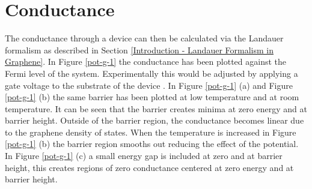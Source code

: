 		\section{Conductance}
		\label{Rectangular Barrier - Conductance}
	The conductance through a device can then be calculated via the Landauer formalism as described in Section \ref{Introduction - Landauer Formalism in Graphene}. In Figure \ref{pot-g-1} the conductance has been plotted against the Fermi level of the system. Experimentally this would be adjusted by applying a gate voltage to the substrate of the device \cite{b46}. In Figure \ref{pot-g-1} (a) and Figure \ref{pot-g-1} (b) the same barrier has been plotted at low temperature and at room temperature. It can be seen that the barrier creates minima at zero energy and at barrier height. Outside of the barrier region, the conductance becomes linear due to the graphene density of states. When the temperature is increased in Figure \ref{pot-g-1} (b) the barrier region smooths out reducing the effect of the potential. In Figure \ref{pot-g-1} (c) a small energy gap is included at zero and at barrier height, this creates regions of zero conductance centered at zero energy and at barrier height.
